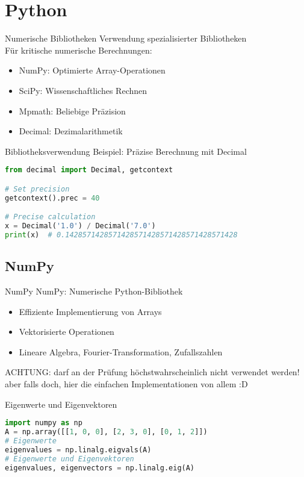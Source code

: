 
\section{Python}

\begin{remark2}{Numerische Bibliotheken} Verwendung spezialisierter Bibliotheken\\
Für kritische numerische Berechnungen:
\begin{itemize}
    \item NumPy: Optimierte Array-Operationen
    \item SciPy: Wissenschaftliches Rechnen
    \item Mpmath: Beliebige Präzision
    \item Decimal: Dezimalarithmetik
\end{itemize}
\end{remark2}

\begin{example2}{Bibliotheksverwendung} Beispiel: Präzise Berechnung mit Decimal
\begin{lstlisting}[language=Python, style=basesmol]
from decimal import Decimal, getcontext

# Set precision
getcontext().prec = 40

# Precise calculation
x = Decimal('1.0') / Decimal('7.0')
print(x)  # 0.1428571428571428571428571428571428571428
\end{lstlisting}
\end{example2}

\subsection{NumPy}

\begin{remark2}{NumPy} NumPy: Numerische Python-Bibliothek
\begin{itemize}
    \item Effiziente Implementierung von Arrays
    \item Vektorisierte Operationen
    \item Lineare Algebra, Fourier-Transformation, Zufallszahlen
\end{itemize} 
ACHTUNG: darf an der Prüfung höchstwahrscheinlich nicht verwendet werden!
aber falls doch, hier die einfachen Implementationen von allem :D
\end{remark2}

\begin{examplecode}{Eigenwerte und Eigenvektoren}
\begin{lstlisting}[language=Python, style=basesmol]
import numpy as np
A = np.array([[1, 0, 0], [2, 3, 0], [0, 1, 2]])
# Eigenwerte
eigenvalues = np.linalg.eigvals(A)
# Eigenwerte und Eigenvektoren
eigenvalues, eigenvectors = np.linalg.eig(A)
\end{lstlisting}
\end{examplecode}